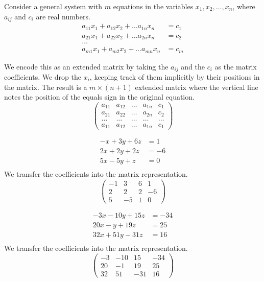 \documentclass[fleqn]{report}
\begin{document}
Consider a general system with $m$ equations in the variables
$x_1, x_2, \ldots, x_n$, where $a_{ij}$ and $c_i$ are real
numbers.
\begin{align*}
a_{11} x_1 + a_{12} x_2 + \ldots a_{1n} x_n & = c_1 \\
a_{21} x_1 + a_{22} x_2 + \ldots a_{2n} x_n & = c_2 \\
\ldots & \\
a_{m1} x_1 + a_{m2} x_2 + \ldots a_{mn} x_n & = c_m
\end{align*}

We encode this as an extended matrix by taking the $a_{ij}$ and
the $c_i$ as the matrix coefficients. We drop the $x_i$, keeping
track of them implicitly by their positions in the matrix. The
result is a $m \times (n+1)$ extended matrix where the
vertical line notes the position of the equals sign in the
original equation. 
\begin{displaymath}
\left(
\begin{array}{cccc|c}
a_{11} & a_{12} & \ldots & a_{1n} & c_1 \\
a_{21} & a_{22} & \ldots & a_{2n} & c_2 \\
\ldots & \ldots & \ldots & \ldots & \ldots \\
a_{11} & a_{12} & \ldots & a_{1n} & c_1 
\end{array}
\right)
\end{displaymath}

\begin{example}
\begin{align*}
-x+3y+6z & = 1\\
2x + 2y + 2z & = -6 \\
5x-5y+z & = 0 \\
\end{align*}
We transfer the coefficients into the matrix representation.
\begin{displaymath}
\left(
\begin{array}{ccc|c}
-1 & 3 & 6 & 1 \\
2 & 2 & 2 & -6 \\
5 & -5 & 1 & 0 
\end{array}
\right)
\end{displaymath}
\end{example}

\begin{example}
\begin{align*}
-3x-10y+15z & = -34\\
20x - y + 19z & = 25 \\
32x + 51y - 31z & = 16 \\
\end{align*}
We transfer the coefficients into the matrix representation.
\begin{displaymath}
\left(
\begin{array}{ccc|c}
-3 & -10 & 15 & -34 \\
20 & -1 & 19 & 25 \\
32 & 51 & -31 & 16
\end{array}
\right)
\end{displaymath}
\end{example}
\end{document}
